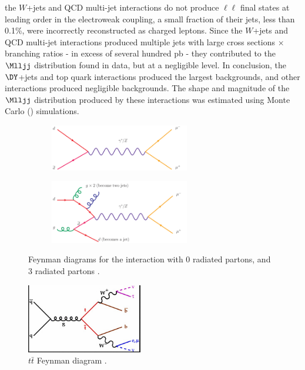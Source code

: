 the $W$+jets and QCD multi-jet interactions do not produce $\ell\ell$ final states at leading order in the electroweak coupling, 
a small fraction of their jets, less than 0.1\%, were incorrectly reconstructed as charged leptons.  Since the $W$+jets and QCD 
multi-jet interactions produced multiple jets with large cross sections $\times$ branching ratios - in excess of several hundred pb 
\cite{wJetsMeas,jetProductionMeas} - they contributed to the $\Mlljj$ distribution found in data, but at a negligible level.  
In conclusion, the $\DY$+jets and top quark interactions produced the largest backgrounds, and other interactions produced negligible 
backgrounds.  The shape and magnitude of the $\Mlljj$ distribution produced by these interactions was estimated using Monte Carlo 
(\MC) simulations.

\clearpage

\begin{figure}
	\centering
	\begin{subfigure}[t]{2.4in}
		\centering
		\includegraphics[width=2.4in]{figures/dyNoJetFeynDiagram.png}
	\end{subfigure}
	\thickspace
	\begin{subfigure}[t]{2.4in}
		\centering
		\includegraphics[width=2.4in]{figures/dyThreeJetFeynDiagram.png}
	\end{subfigure}
	\caption{Feynman diagrams for the \DY interaction with 0 radiated partons, and 3 radiated partons \cite{dyDiagrams}.}
	\label{fig:dyDiags}
\end{figure}

\begin{figure}[h]
	\centering
	\includegraphics[width=0.45\textwidth]{figures/topAntiTopFeynDiagram.png}
	\caption{$t\bar{t}$ Feynman diagram \cite{ttbarDiagram}.}
	\label{fig:ttbarDiag}
\end{figure}

